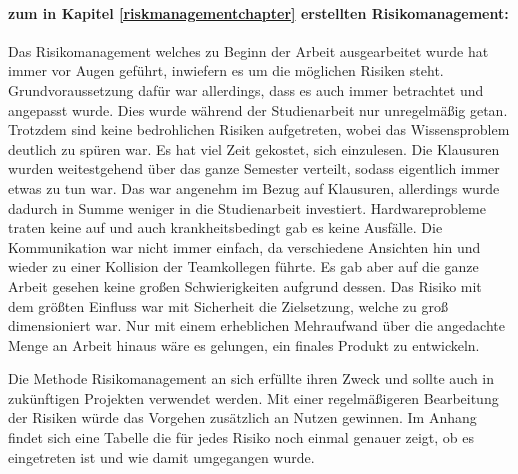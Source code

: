 \paragraph{zum in Kapitel \ref{riskmanagementchapter} erstellten Risikomanagement:} Das Risikomanagement welches zu Beginn der Arbeit ausgearbeitet wurde hat immer vor Augen geführt, inwiefern es um die möglichen Risiken steht. Grundvoraussetzung dafür war allerdings, dass es auch immer betrachtet und angepasst wurde. Dies wurde während der Studienarbeit nur unregelmäßig getan. Trotzdem sind keine bedrohlichen Risiken aufgetreten, wobei das Wissensproblem deutlich zu spüren war. Es hat viel Zeit gekostet, sich einzulesen. Die Klausuren wurden weitestgehend über das ganze Semester verteilt, sodass eigentlich immer etwas zu tun war. Das war angenehm im Bezug auf Klausuren, allerdings wurde dadurch in Summe weniger in die Studienarbeit investiert. Hardwareprobleme traten keine auf und auch krankheitsbedingt gab es keine Ausfälle. Die Kommunikation war nicht immer einfach, da verschiedene Ansichten hin und wieder zu einer Kollision der Teamkollegen führte. Es gab aber auf die ganze Arbeit gesehen keine großen Schwierigkeiten aufgrund dessen. Das Risiko mit dem größten Einfluss war mit Sicherheit die Zielsetzung, welche zu groß dimensioniert war. Nur mit einem erheblichen Mehraufwand über die angedachte Menge an Arbeit hinaus wäre es gelungen, ein finales Produkt zu entwickeln. 

Die Methode Risikomanagement an sich erfüllte ihren Zweck und sollte auch in zukünftigen Projekten verwendet werden. Mit einer regelmäßigeren Bearbeitung der Risiken würde das Vorgehen zusätzlich an Nutzen gewinnen. Im Anhang findet sich eine Tabelle die für jedes Risiko noch einmal genauer zeigt, ob es eingetreten ist und wie damit umgegangen wurde.

